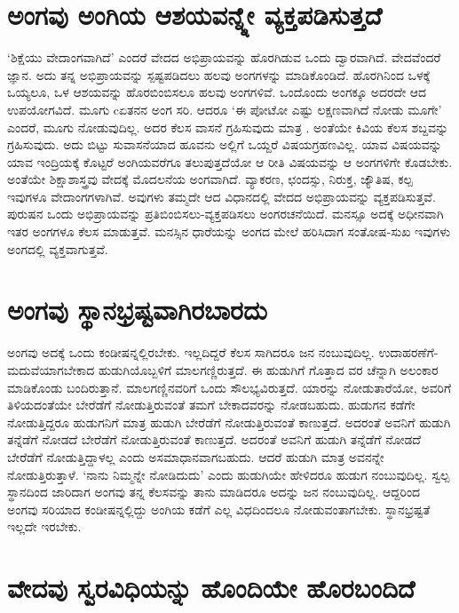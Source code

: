 \section*{ಅಂಗವು ಅಂಗಿಯ ಆಶಯವನ್ನ್ನೇ ವ್ಯಕ್ತಪಡಿಸುತ್ತದೆ}

`ಶಿಕ್ಷೆಯು ವೇದಾಂಗವಾಗಿದೆ' ಎಂದರೆ ವೇದದ ಅಭಿಪ್ರಾಯವನ್ನು  ಹೊರಗಿಡುವ ಒಂದು ದ್ವಾರವಾಗಿದೆ. ವೇದವೆಂದರೆ  ಜ್ಞಾನ. ಅದು ತನ್ನ ಅಭಿಪ್ರಾಯವನ್ನು  ಸ್ಪಷ್ಟಪಡಿದಲು ಹಲವು ಅಂಗಗಳನ್ನು ಮಾಡಿಕೊಂಡಿದೆ. ಹೊರಗಿನಿಂದ ಒಳಕ್ಕೆ  ಒಯ್ಯಲೂ, ಒಳ ಆಶಯವನ್ನು  ಹೊರಬಿಂಬಿಸಲೂ ಹಲವು ಅಂಗಗಳಿವೆ. ಒಂದೊಂದು  ಅಂಗಕ್ಕೂ ಅದರದೇ ಆದ ಉಪಯೋಗವಿದೆ. ಮೂಗು cಏತನನ ಅಂಗ ಸರಿ. ಆದರೂ `ಈ ಪೋಟೋ ಎಷ್ಟು ಲಕ್ಷಣವಾಗಿದೆ ನೋಡು ಮೂಗೇ' ಎಂದರೆ, ಮೂಗು ನೋಡುವುದಿಲ್ಲ. ಅದರ ಕೆಲಸ ವಾಸನೆ ಗ್ರಹಿಸುವುದು ಮಾತ್ರ . ಅಂತೆಯೇ ಕಿವಿಯ ಕೆಲಸ ಶಬ್ದವನ್ನು ಗ್ರಹಿಸುವುದು. ಅದು ಬಿಟ್ಟು ಸುವಾಸನೆಯಾದ ಹೂವನು ಅಲ್ಲಿಗೆ ಒಯ್ದರೆ ವಿಷಯಗ್ರಹಣವಿಲ್ಲ. ಯಾವ ವಿಷಯವನ್ನು  ಯಾವ ಇಂದ್ರಿಯಕ್ಕೆ  ಕೊಟ್ಟರೆ ಅಂಗಿಯವರೆಗೂ ತಲುಪುತ್ತದೆಯೋ ಆ ರೀತಿ ವಿಷಯವನ್ನು  ಆ ಅಂಗಗಳಿಗೇ ಕೊಡಬೇಕು. ಅಂತೆಯೇ ಶಿಕ್ಷಾಶಾಸ್ತ್ರವು ವೇದಕ್ಕೆ  ಮೊದಲನೆಯ ಅಂಗವಾಗಿದೆ. ವ್ಯಾಕರಣ, ಛಂದಸ್ಸು, ನಿರುಕ್ತ, ಜ್ಯೌತಿಷ, ಕಲ್ಪ ಇವುಗಳೂ ವೇದಾಂಗಗಳಾಗಿವೆ. ಅವುಗಳು ತಮ್ಮದೇ ಆದ ವಿಧಾನದಲ್ಲಿ ವೇದದ ಅಭಿಪ್ರಾಯವನ್ನು  ವ್ಯಕ್ತಪಡಿಸುತ್ತವೆ. ಪುರುಷನ ಒಂದು ಅಭಿಪ್ರಾಯವನ್ನು ಪ್ರತಿಬಿಂಬಿಸಲು-ವ್ಯಕ್ತಪಡಿಸಲು ಅಂಗರಚನೆಯಿದೆ. ಮನಸ್ಸೂ  ಅದಕ್ಕೆ  ಅಧೀನವಾಗಿ ಇತರ ಅಂಗಗಳೂ ಕೆಲಸ ಮಾಡುತ್ತವೆ. ಮನಸ್ಸಿನ ಧಾರೆಯನ್ನು  ಅಂಗದ ಮೇಲೆ ಹರಿಸಿದಾಗ ಸಂತೋಷ-ಸುಖ ಇವುಗಳು ಅಂಗದಲ್ಲಿ ವ್ಯಕ್ತವಾಗುತ್ತವೆ. 

\section*{ಅಂಗವು ಸ್ಥಾನಭ್ರಷ್ಟವಾಗಿರಬಾರದು}

ಅಂಗವು ಅದಕ್ಕೆ  ಒಂದು ಕಂಡೀಷನ್ನಲ್ಲಿರಬೇಕು. ಇಲ್ಲದಿದ್ದರೆ ಕೆಲಸ ಸಾಗಿದರೂ ಜನ ನಂಬುವುದಿಲ್ಲ. ಉದಾಹರಣೆಗೆ- ಮದುವೆಯಾಗಬೇಕಾದ ಹುಡುಗಿಯೊಬ್ಬಳಿಗೆ ಮಾಲಗಣ್ಣಿರುತ್ತದೆ. ಈ ಹುಡುಗಿಗೆ ಗೊತ್ತಾದ ವರ ಚೆನ್ನಾಗಿ ಅಲಂಕಾರ ಮಾಡಿಕೊಂಡು ಬಂದಿರುತ್ತಾನೆ. ಮಾಲಗಣ್ಣಿನವರಿಗೆ ಒಂದು ಸೌಲಭ್ಯವಿರುತ್ತದೆ. ಯಾರನ್ನು  ನೋಡುತಾರೆಯೋ, ಅವರಿಗೆ ತಿಳಿಯದಂತೆಯೇ ಬೇರೆಡೆಗೆ ನೋಡುತ್ತಿರುವಂತೆ ತಮಗೆ ಬೇಕಾದವರನ್ನು  ನೋಡಬಹುದು. ಹುಡುಗನ ಕಡೆಗೇ ನೋಡುತ್ತಿದ್ದರೂ ಹುಡುಗನಿಗೆ  ಮಾತ್ರ ಹುಡುಗಿ ಬೇರೆಡೆಗೆ ನೋಡುತ್ತಿರುವಂತೆ ಕಾಣುತ್ತದೆ. ಅದರಂತೆ ಅವನಿಗೆ ಹುಡುಗಿ ತನ್ನೆಡೆಗೆ ನೋಡದೆ ಬೇರೆಡೆಗೆ ನೋಡುತ್ತಿರುವಂತೆ ಕಾಣುತ್ತದೆ. ಅದರಂತೆ ಅವನಿಗೆ ಹುಡುಗಿ ತನ್ನೆಡೆಗೆ ನೋಡದೆ ಬೇರೆಡೆಗೆ ನೋಡುತ್ತಿದ್ದಾಳಲ್ಲ ಎಂದು ಅಸಮಾಧಾನವಾಗಬಹುದು. ಆದರೆ ಹುಡುಗಿ ಮಾತ್ರ ಅವನನ್ನೇ ನೋಡುತ್ತಿರುತ್ತಾಳೆ. `ನಾನು ನಿಮ್ಮನ್ನೇ ನೋಡಿದುದು' ಎಂದು ಹುಡುಗಿಯೇ ಹೇಳಿದರೂ ಹುಡುಗ  ನಂಬುವುದಿಲ್ಲ. ಸ್ವಲ್ಪ ಸ್ಥಾನದಿಂದ ಜಾರಿದಾಗ ಅಂಗವು ತನ್ನ ಕೆಲಸವನ್ನು  ತಾನು ಮಾಡಿದರೂ ಅದನ್ನು  ಜನ ನಂಬುವುದಿಲ್ಲ. ಆದ್ದರಿಂದ ಅಂಗವು ಸರಿಯಾದ ಕಂಡೀಷನ್ನಲ್ಲಿದ್ದು ಅಂಗಿಯ ಕಡೆಗೆ ಎಲ್ಲ ವಿಧದಿಂದಲೂ ನೋಡುವಂತಾಗಬೇಕು. ಸ್ಥಾನಭ್ರಷ್ಟತೆ ಇಲ್ಲದೇ ಇರಬೇಕು.

\section*{ವೇದವು ಸ್ವರವಿಧಿಯನ್ನು  ಹೊಂದಿಯೇ ಹೊರಬಂದಿದೆ}

